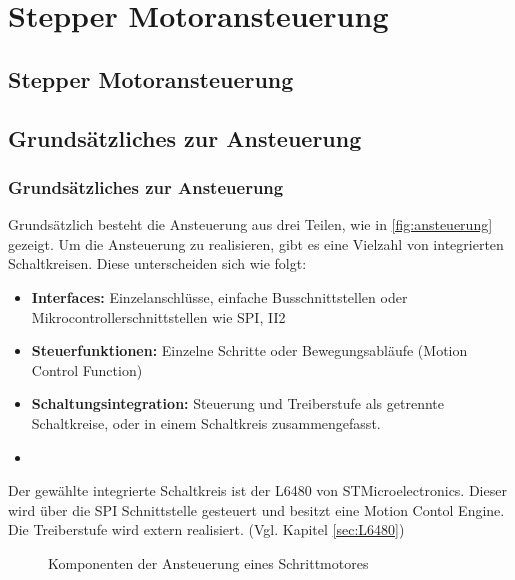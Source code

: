 \ifSTANDALONE
\section{Stepper Motoransteuerung}
\fi
\ifEMBED
\subsection{Stepper Motoransteuerung}
\fi

\ifEMBED
    \BLDCcollab
\fi
\ifSTANDALONE
    \subsection{Grundsätzliches zur Ansteuerung}\label{subsec:Ansteuerung}
\fi
\ifEMBED
    \subsubsection{Grundsätzliches zur Ansteuerung}\label{subsec:Ansteuerung}
\fi
	Grundsätzlich besteht die Ansteuerung aus drei Teilen, wie in 
    \autoref*{fig:ansteuerung} gezeigt. 
    Um die Ansteuerung zu realisieren, gibt es eine Vielzahl von 
    integrierten Schaltkreisen. Diese unterscheiden sich wie folgt: 
    \begin{itemize}
    	\item \textbf{Interfaces:} Einzelanschlüsse, einfache 
            Busschnittstellen oder Mikrocontrollerschnittstellen wie SPI, 
            II2
    	\item \textbf{Steuerfunktionen:} Einzelne Schritte oder 
            Bewegungsabläufe (Motion Control Function)
    	\item \textbf{Schaltungsintegration:} Steuerung und Treiberstufe als 
            getrennte Schaltkreise, oder in einem Schaltkreis zusammengefasst. 
        \item[] \cite{Doku:Stepper} 
    \end{itemize}
    
    Der gewählte integrierte Schaltkreis ist der L6480 von 
    STMicroelectronics. Dieser wird über die SPI Schnittstelle gesteuert 
    und besitzt eine Motion Contol Engine. Die Treiberstufe wird extern 
    realisiert. (Vgl. Kapitel \ref{sec:L6480}) 
	\begin{figure}[h!]
		\centering
		\caption{Komponenten der Ansteuerung eines Schrittmotores}
		\label{fig:ansteuerung}
	\end{figure}
    
